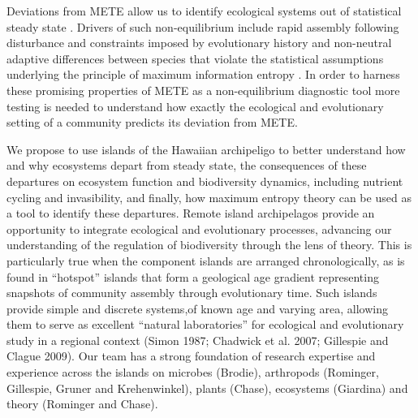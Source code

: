 \documentclass[11pt]{article}
\begin{document}
Deviations from METE allow us to identify ecological systems out of
statistical steady state \citep{harte2011, rominger2015}.  Drivers of
such non-equilibrium include rapid assembly following disturbance
\citep{harte2011} and constraints imposed by evolutionary history and
non-neutral adaptive differences between species that violate the
statistical assumptions underlying the principle of maximum
information entropy \citep{rominger2015}.  In order to harness these
promising properties of METE as a non-equilibrium diagnostic tool more
testing is needed to understand how exactly the ecological and
evolutionary setting of a community predicts its deviation from METE.

We propose to use islands of the Hawaiian archipeligo to better
understand how and why ecosystems depart from steady state, the
consequences of these departures on ecosystem function and
biodiversity dynamics, including nutrient cycling and invasibility,
and finally, how maximum entropy theory can be used as a tool to
identify these departures.  Remote island archipelagos provide an
opportunity to integrate ecological and evolutionary processes,
advancing our understanding of the regulation of biodiversity through
the lens of theory.  This is particularly true when the component
islands are arranged chronologically, as is found in ``hotspot''
islands that form a geological age gradient representing snapshots of
community assembly through evolutionary time. Such islands provide
simple and discrete systems,of known age and varying area, allowing
them to serve as excellent ``natural laboratories'' for ecological and
evolutionary study in a regional context (Simon 1987; Chadwick et
al. 2007; Gillespie and Clague 2009). Our team has a strong foundation
of research expertise and experience across the islands on microbes
(Brodie), arthropods (Rominger, Gillespie, Gruner and Krehenwinkel),
plants (Chase), ecosystems (Giardina) and theory (Rominger and Chase).
\end{document}

